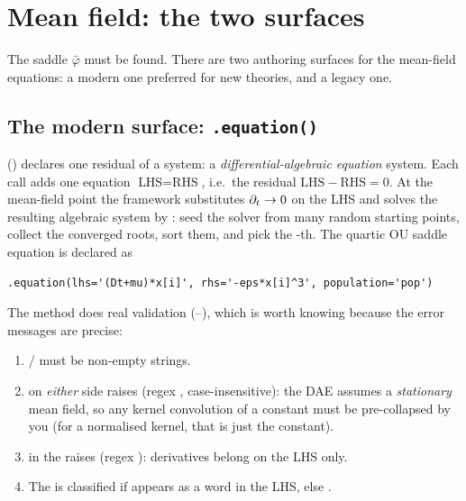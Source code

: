 \section{Mean field: the two surfaces}

The saddle $\bar\varphi$ must be found. There are two authoring surfaces for the
mean-field equations: a modern one preferred for new theories, and a legacy one.

\subsection{The modern surface: \texttt{.equation()}}

 () declares one residual of a
 system: a \emph{differential-algebraic equation} system. Each call adds
one equation $\text{LHS} = \text{RHS}$, i.e.\ the residual
$\text{LHS}-\text{RHS}=0$. At the mean-field point the framework substitutes
$\partial_t\to 0$ on the LHS and solves the resulting algebraic system by
: seed the solver from many random starting points,
collect the converged roots, sort them, and pick the -th.
The quartic OU saddle equation is declared as

\begin{lstlisting}
.equation(lhs='(Dt+mu)*x[i]', rhs='-eps*x[i]^3', population='pop')
\end{lstlisting}

The method does real validation (--),
which is worth knowing because the error messages are precise:

\begin{enumerate}
  \item {}/ must be non-empty strings.
  \item {} on \emph{either} side raises (regex
        ,
        case-insensitive): the DAE assumes a \emph{stationary} mean field, so any
        kernel convolution of a constant must be pre-collapsed by you (for a
        normalised kernel, that is just the constant).
  \item {} in the  raises (regex
        ): derivatives belong on the LHS
        only.
  \item The  is classified  if  appears
        as a word in the LHS, else .
\end{enumerate}

